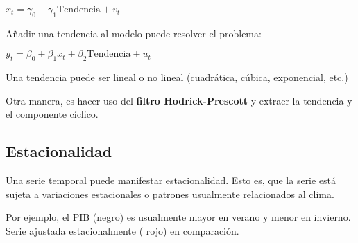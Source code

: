 \documentclass[10pt, a4paper, landscape]{extarticle}
\begin{document}
\begin{multicols}{3}
\begin{center}
	$x_t = \gamma_0 + \gamma_1 \mathrm{Tendencia} + v_t$
\end{center}

Añadir una tendencia al modelo puede resolver el problema:

\begin{center}
	$y_t = \beta_0 + \beta_1 x_t + \beta_2 \mathrm{Tendencia} + u_t$
\end{center}

Una tendencia puede ser lineal o no lineal (cuadrática, cúbica, exponencial, etc.)

Otra manera, es hacer uso del \textbf{filtro Hodrick-Prescott} y extraer la tendencia y el componente cíclico.

\subsection*{Estacionalidad}

\setlength{\multicolsep}{0pt}
\begin{multicols}{2}

	Una serie temporal puede manifestar estacionalidad. Esto es, que la serie está sujeta a variaciones estacionales o patrones usualmente relacionados al clima.

	Por ejemplo, el PIB (negro) es usualmente mayor en verano y menor en invierno. Serie ajustada estacionalmente ({\color{red} rojo}) en comparación.

\columnbreak


\end{multicols}
\end{multicols}
\end{document}
